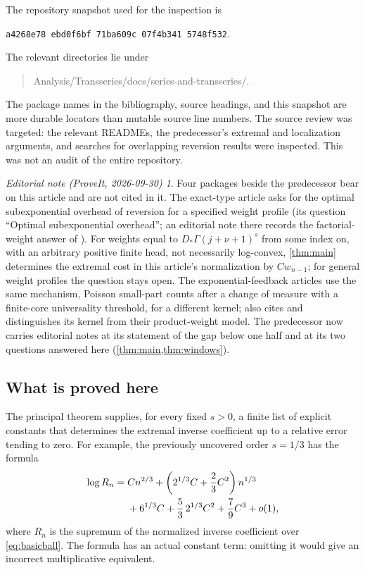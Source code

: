 \documentclass[11pt,a4paper]{article}
\theoremstyle{definition}
\theoremstyle{remark}
\newtheorem*{ednote}{Editorial note (ProveIt, 2026-09-30)}
\numberwithin{equation}{section}
\newcommand{\snapshot}{\texttt{a4268e78\,ebd0f6bf\,71ba609c\,07f4b341\,5748f532}}
\begin{document}
The repository snapshot used for the inspection is
\begin{center}\snapshot.\end{center}
The relevant directories lie under
\begin{quote}\small\ttfamily
Analysis/Transseries/docs/series-and-transseries/.
\end{quote}
The package names in the bibliography, source headings, and this
snapshot are more durable locators than mutable source line numbers.
The source review was targeted: the relevant READMEs, the predecessor's
extremal and localization arguments, and searches for overlapping
reversion results were inspected. This was not an audit of the entire
repository.
\begin{ednote}
Four packages beside the predecessor bear on this article and are not cited
in it. The exact-type article \cite{ed:exacttype} asks for the optimal
subexponential overhead of reversion for a specified weight profile (its
question ``Optimal subexponential overhead''; an editorial note there records
the factorial-weight answer of \cite{subexp}). For weights equal to
$D_*\Gamma(j+\nu+1)^s$ from some index on, with an arbitrary positive finite
head, not necessarily log-convex, \cref{thm:main} determines the extremal
cost in this article's normalization by $Cw_{n-1}$; for general weight
profiles the question stays open. The exponential-feedback articles
\cite{ed:finitecore,ed:microcond,ed:poissonlayers} use the same mechanism,
Poisson small-part counts after a change of measure with a finite-core
universality threshold, for a different kernel; \cite{ed:finitecore} also
cites \cite{jjs} and distinguishes its kernel from their product-weight
model. The predecessor \cite{subexp} now carries editorial notes at its
statement of the gap below one half and at its two questions answered here
(\cref{thm:main,thm:windows}).
\end{ednote}

\subsection{What is proved here}
The principal theorem supplies, for every fixed $s>0$, a finite list of
explicit constants that determines the extremal inverse coefficient up
to a relative error tending to zero. For example, the previously
uncovered order $s=1/3$ has the formula
\begin{align}
 \log R_n={}&Cn^{2/3}
 +\left(2^{1/3}C+\frac23C^2\right)n^{1/3}\notag\\
 &+6^{1/3}C+\frac53\,2^{1/3}C^2+\frac79C^3+o(1),
 \label{eq:introthird}
\end{align}
where $R_n$ is the supremum of the normalized inverse coefficient over
\eqref{eq:basicball}. The formula has an actual constant term: omitting
it would give an incorrect multiplicative equivalent.
\end{document}
